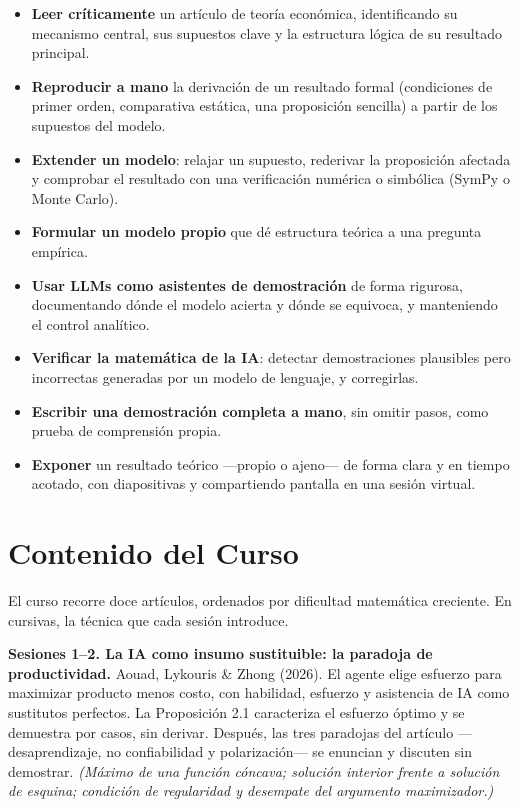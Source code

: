 \documentclass[11pt]{article}
\begin{document}
\begin{itemize}
\item \textbf{Leer cr\'iticamente} un art\'iculo de teor\'ia econ\'omica, identificando su mecanismo central, sus supuestos clave y la estructura l\'ogica de su resultado principal.
\item \textbf{Reproducir a mano} la derivaci\'on de un resultado formal (condiciones de primer orden, comparativa est\'atica, una proposici\'on sencilla) a partir de los supuestos del modelo.
\item \textbf{Extender un modelo}: relajar un supuesto, rederivar la proposici\'on afectada y comprobar el resultado con una verificaci\'on num\'erica o simb\'olica (SymPy o Monte Carlo).
\item \textbf{Formular un modelo propio} que d\'e estructura te\'orica a una pregunta emp\'irica.
\item \textbf{Usar LLMs como asistentes de demostraci\'on} de forma rigurosa, documentando d\'onde el modelo acierta y d\'onde se equivoca, y manteniendo el control anal\'itico.
\item \textbf{Verificar la matem\'atica de la IA}: detectar demostraciones plausibles pero incorrectas generadas por un modelo de lenguaje, y corregirlas.
\item \textbf{Escribir una demostraci\'on completa a mano}, sin omitir pasos, como prueba de comprensi\'on propia.
\item \textbf{Exponer} un resultado te\'orico ---propio o ajeno--- de forma clara y en tiempo acotado, con diapositivas y compartiendo pantalla en una sesi\'on virtual.
\end{itemize}

\section{Contenido del Curso}

El curso recorre doce art\'iculos, ordenados por dificultad matem\'atica creciente. En cursivas, la t\'ecnica que cada sesi\'on introduce.

\textbf{Sesiones 1--2. La IA como insumo sustituible: la paradoja de productividad.}
Aouad, Lykouris \& Zhong (2026). El agente elige esfuerzo para maximizar producto menos costo, con habilidad, esfuerzo y asistencia de IA como sustitutos perfectos. La Proposici\'on 2.1 caracteriza el esfuerzo \'optimo y se demuestra por casos, sin derivar. Despu\'es, las tres paradojas del art\'iculo ---desaprendizaje, no confiabilidad y polarizaci\'on--- se enuncian y discuten sin demostrar.
\emph{(M\'aximo de una funci\'on c\'oncava; soluci\'on interior frente a soluci\'on de esquina; condici\'on de regularidad y desempate del argumento maximizador.)}
\end{document}
